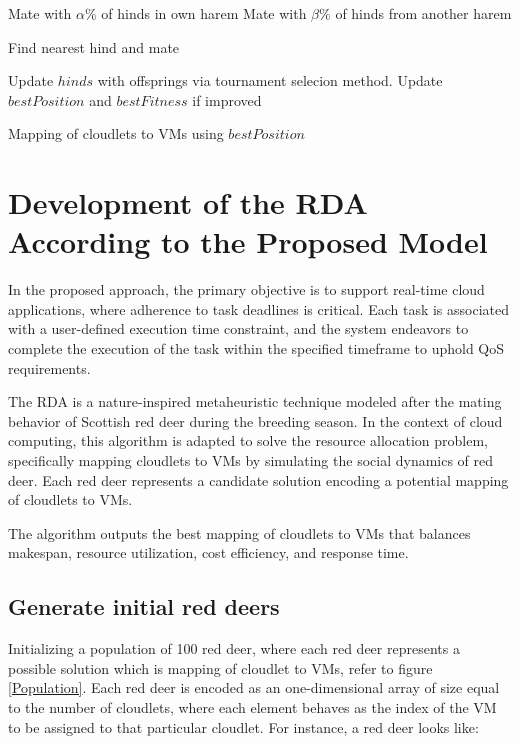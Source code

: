 \documentclass[pdflatex,sn-mathphys-num]{sn-jnl}%
\theoremstyle{thmstyleone}%
\theoremstyle{thmstyletwo}%
\theoremstyle{thmstylethree}%
\begin{document}
\begin{algorithm}
\begin{algorithmic}[1]
            \State Mate with $\alpha\%$ of hinds in own harem
            \State Mate with $\beta\%$ of hinds from another harem
        \EndFor

            \State Find nearest hind and mate
        \EndFor

        \State Update $hinds$ with offsprings via tournament selecion method.
        \State Update $bestPosition$ and $bestFitness$ if improved
    \EndFor

    \State \Return Mapping of cloudlets to VMs using $bestPosition$
\EndProcedure
\end{algorithmic}
\end{algorithm}


\section{Development of the RDA According to the Proposed Model}\label{sec4}
In the proposed approach, the primary objective is to support real-time cloud applications, where adherence to task deadlines is critical. Each task is associated with a user-defined execution time constraint, and the system endeavors to complete the execution of the task within the specified timeframe to uphold QoS requirements.

The RDA is a nature-inspired metaheuristic technique modeled after the mating behavior of Scottish red deer during the breeding season. In the context of cloud computing, this algorithm is adapted to solve the resource allocation problem, specifically mapping cloudlets to VMs by simulating the social dynamics of red deer. Each red deer represents a candidate solution encoding a potential mapping of cloudlets to VMs.

The algorithm outputs the best mapping of cloudlets to VMs that balances makespan, resource utilization, cost efficiency, and response time.



\subsection{Generate initial red deers}\label{subsec4.1}

Initializing a population of 100 red deer, where each red deer represents a possible solution 
which is mapping of cloudlet to VMs, refer to figure \ref{Population}. Each red deer is encoded as an one-dimensional array of size equal to the number of cloudlets, where each element behaves as the index of the VM to be assigned to that particular cloudlet. For instance, a red deer looks like:
\end{document}
